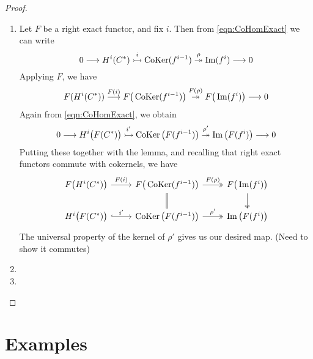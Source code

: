 \documentclass[a4paper]{article}
\def\mono{\rightarrowtail}
\def\epi{\twoheadrightarrow}
\begin{document}
\begin{proof}
    \begin{enumerate}
        \item Let $F$ be a right exact functor, and fix $i$. Then from \ref{eqn:CoHomExact} we can write
        \[
            0 \to H^i(C^*) \stackrel{i}{\mono} \CoKer(f^{i-1}) \stackrel{\rho}{\epi} \im(f^i) \to 0
        \]
        Applying $F$, we have
        \[
             F(H^i(C^*)) \stackrel{F(i)}{\to} F\big(\CoKer(f^{i-1})\big) \stackrel{F(\rho)}{\epi} F\big(\im(f^i)\big) \to 0
        \]
        Again from \ref{eqn:CoHomExact}, we obtain 
        \[
            0 \to H^i\big(F(C^*)\big) \stackrel{i'}{\mono} \CoKer\big(F(f^{i-1})\big) \stackrel{\rho'}{\epi} \im\big(F(f^i)\big) \to 0
        \]
        Putting these together with the lemma, and recalling that right exact functors commute with cokernels, we have
        \[
            \begin{tikzcd}
                F\big( H^i(C^*)\big) \arrow[r,"F(i)"] & F\big(\CoKer(f^{i-1})\big) \arrow[d, equal]\arrow[r, "F(\rho)", two heads] & F\big(\im(f^i)\big) \arrow[d, two heads]\\
                H^i\big(F(C^*)\big) \arrow[r, "i'", hook] & \CoKer\big(F(f^{i-1})\big) \arrow[r, "\rho'", two heads] & \im\big(F(f^i)\big)
            \end{tikzcd}
        \]
        The universal property of the kernel of $\rho'$ gives us our desired map. (Need to show it commutes)
        \item
        \item
    \end{enumerate}
\end{proof}
\section{Examples}
\end{document}
